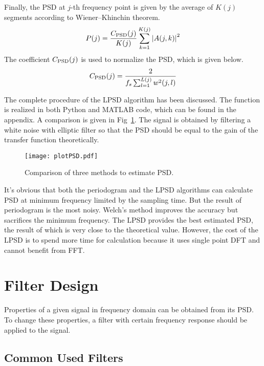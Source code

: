 Finally, the PSD at $j$-th frequency point is given by the average of $K(j)$ segments according to Wiener–Khinchin theorem.
\begin{equation}
    P(j) = \frac{C_{\rm PSD}(j)}{K(j)} \sum_{k=1}^{K(j)} \left| A(j,k) \right|^2
\end{equation}
The coefficient $C_{\rm PSD}(j)$ is used to normalize the PSD, which is given below.
\begin{equation}
    C_{\rm PSD}(j) = \frac{2}{f_s\sum_{l=1}^{L(j)} w^2(j,l)}
\end{equation}


The complete procedure of the LPSD algorithm has been discussed. The function is realized in both Python and MATLAB code, which can be found in the appendix. A comparison is given in Fig~\ref{fig:plotPSD}. The signal is obtained by filtering a white noise with elliptic filter so that the PSD should be equal to the gain of the transfer function theoretically.


\begin{figure}[!htb]
    \centering
    \texttt{[image: plotPSD.pdf]}
    \caption{Comparison of three methods to estimate PSD.}
    \label{fig:plotPSD}
\end{figure}


It's obvious that both the periodogram and the LPSD algorithms can calculate PSD at minimum frequency limited by the sampling time. But the result of periodogram is the most noisy. Welch's method improves the accuracy but sacrifices the minimum frequency. The LPSD provides the best estimated PSD, the result of which is very close to the theoretical value. However, the cost of the LPSD is to spend more time for calculation because it uses single point DFT and cannot benefit from FFT.




\section{Filter Design}


Properties of a given signal in frequency domain can be obtained from its PSD. To change these properties, a filter with certain frequency response should be applied to the signal. 




\subsection{Common Used Filters}


